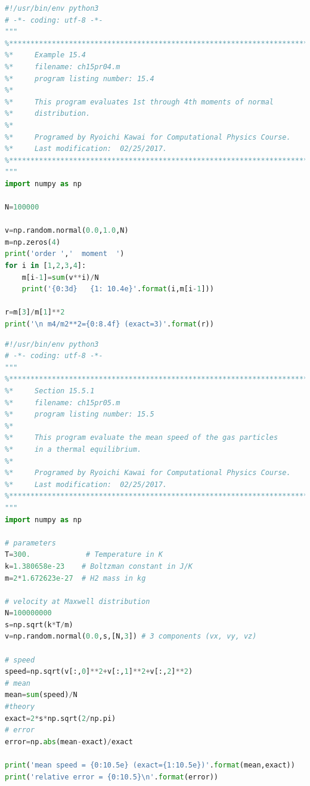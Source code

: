 \bigskip
\noindent
\program
\footnotesize
\begin{lstlisting}[language=python]
#!/usr/bin/env python3
# -*- coding: utf-8 -*-
"""
%**************************************************************************
%*     Example 15.4                                                       *
%*     filename: ch15pr04.m                                               *
%*     program listing number: 15.4                                       *
%*                                                                        *
%*     This program evaluates 1st through 4th moments of normal           *
%*     distribution.                                                      *
%*                                                                        *
%*     Programed by Ryoichi Kawai for Computational Physics Course.       *
%*     Last modification:  02/25/2017.                                    *
%**************************************************************************
"""
import numpy as np

N=100000

v=np.random.normal(0.0,1.0,N)
m=np.zeros(4)
print('order ','  moment  ')
for i in [1,2,3,4]:
    m[i-1]=sum(v**i)/N
    print('{0:3d}   {1: 10.4e}'.format(i,m[i-1]))
    
r=m[3]/m[1]**2
print('\n m4/m2**2={0:8.4f} (exact=3)'.format(r))
\end{lstlisting}
\normalsize

\bigskip
\noindent
\program
\footnotesize
\begin{lstlisting}[language=python]
#!/usr/bin/env python3
# -*- coding: utf-8 -*-
"""
%**************************************************************************
%*     Section 15.5.1                                                     *
%*     filename: ch15pr05.m                                               *
%*     program listing number: 15.5                                       *
%*                                                                        *
%*     This program evaluate the mean speed of the gas particles          *
%*     in a thermal equilibrium.                                          *
%*                                                                        *
%*     Programed by Ryoichi Kawai for Computational Physics Course.       *
%*     Last modification:  02/25/2017.                                    *
%**************************************************************************
"""
import numpy as np

# parameters
T=300.             # Temperature in K
k=1.380658e-23    # Boltzman constant in J/K
m=2*1.672623e-27  # H2 mass in kg

# velocity at Maxwell distribution
N=100000000
s=np.sqrt(k*T/m)
v=np.random.normal(0.0,s,[N,3]) # 3 components (vx, vy, vz)

# speed
speed=np.sqrt(v[:,0]**2+v[:,1]**2+v[:,2]**2)
# mean
mean=sum(speed)/N
#theory
exact=2*s*np.sqrt(2/np.pi)
# error
error=np.abs(mean-exact)/exact

print('mean speed = {0:10.5e} (exact={1:10.5e})'.format(mean,exact))
print('relative error = {0:10.5}\n'.format(error))
\end{lstlisting}
\normalsize

